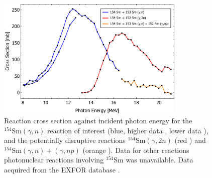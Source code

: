 \documentclass[../main.tex]{subfiles}
\begin{document}
\begin{figure}[!h]
\centering
\includegraphics[width=0.8\textwidth]{Figures/DIANA_Inverse_Compton_Source_Design/Sm154Landscape.pdf}
\caption{Reaction cross section against incident photon energy for the $^{154}\mathrm{Sm} \left(\gamma,n\right)$ reaction of interest (blue, higher data \cite{carlos1974giant}, lower data \cite{filipescu2014photoneutron}), and the potentially disruptive reactions $^{154}\mathrm{Sm} \left(\gamma,2n\right)$ (red \cite{carlos1974giant}) and $^{154}\mathrm{Sm} \left(\gamma,n\right) + \left(\gamma,np\right)$ (orange \cite{carlos1974giant}). Data for other reactions photonuclear reactions involving $^{154}\mathrm{Sm}$ was unavailable. Data acquired from the EXFOR database \cite{zerkin2018experimental}. }
\label{fig:154Sm_cross_section_photon_energy}
\end{figure}
\end{document}
